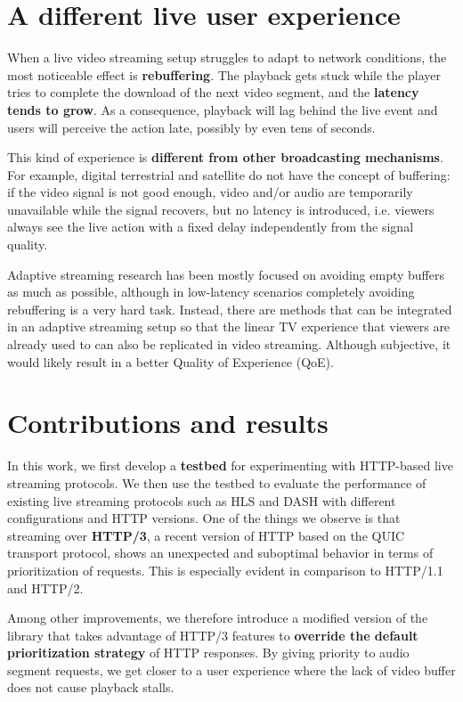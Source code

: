 \section{A different live user experience}
\label{sec:intro/experience}

When a live video streaming setup struggles to adapt to network conditions, the most noticeable effect is \textbf{rebuffering}. The playback gets stuck while the player tries to complete the download of the next video segment, and the \textbf{latency tends to grow}. As a consequence, playback will lag behind the live event and users will perceive the action late, possibly by even tens of seconds.

This kind of experience is \textbf{different from other broadcasting mechanisms}. For example, digital terrestrial and satellite do not have the concept of buffering: if the video signal is not good enough, video and/or audio are temporarily unavailable while the signal recovers, but no latency is introduced, i.e. viewers always see the live action with a fixed delay independently from the signal quality.

Adaptive streaming research has been mostly focused on avoiding empty buffers as much as possible, although in low-latency scenarios completely avoiding rebuffering is a very hard task. Instead, there are methods that can be integrated in an adaptive streaming setup so that the linear TV experience that viewers are already used to can also be replicated in video streaming. Although subjective, it would likely result in a better Quality of Experience (QoE).

\section{Contributions and results}
\label{sec:intro/contributions}

In this work, we first develop a \textbf{testbed} for experimenting with HTTP-based live streaming protocols. We then use the testbed to evaluate the performance of existing live streaming protocols such as HLS and DASH with different configurations and HTTP versions. One of the things we observe is that streaming over \textbf{HTTP/3}, a recent version of HTTP based on the QUIC transport protocol, shows an unexpected and suboptimal behavior in terms of prioritization of requests. This is especially evident in comparison to HTTP/1.1 and HTTP/2.

Among other improvements, we therefore introduce a modified version of the \hlsjs{} library that takes advantage of HTTP/3 features to \textbf{override the default prioritization strategy} of HTTP responses. By giving priority to audio segment requests, we get closer to a user experience where the lack of video buffer does not cause playback stalls.

